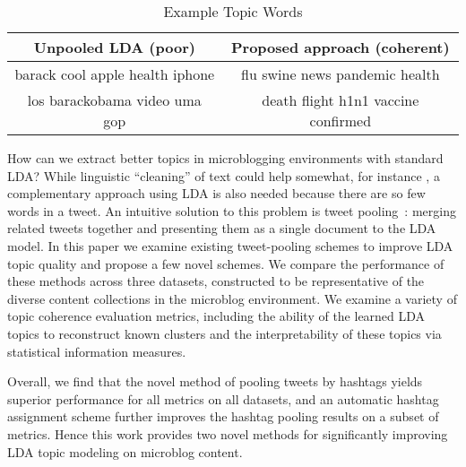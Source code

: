 \documentclass{sig-alternate}
\begin{document}
\begin{table}[t!]
\centering
\caption{Example Topic Words}\label{tbl-0}
\resizebox{8.5cm}{!} 
{
	\begin{tabular}{|c|c|}
	\hline
	 Unpooled LDA (poor) & Proposed approach (coherent) \\
\hline
 {\small barack cool apple health iphone}
 &
 {\small flu swine news pandemic health}\\
 {\small los barackobama video uma gop} & 
{\small death flight h1n1 vaccine confirmed} \\
 \hline
	\end{tabular}
}\vspace*{-10pt}
\end{table}

How can we extract better topics in microblogging environments with
standard LDA?  While linguistic ``cleaning'' of text could help
somewhat, for instance \cite{Han2012}, a complementary approach using
LDA is also needed because there are so few words in a tweet.  An
intuitive solution to this problem is tweet
pooling~\cite{Weng2010wsdm,hong}: merging related tweets together and
presenting them as a single document to the LDA model.  In this paper
we examine existing tweet-pooling schemes to improve LDA topic quality
and propose a few novel schemes.  We compare the performance of these
methods across three datasets, constructed to be representative of the
diverse content collections in the microblog environment. 
We examine a variety of topic coherence evaluation metrics, including
the ability of the learned LDA topics to reconstruct known clusters
and the interpretability of these topics via statistical information
measures.

Overall, we find that the novel method of pooling tweets by hashtags
yields superior performance for all metrics on all datasets, and an
automatic hashtag assignment scheme further improves the hashtag
pooling results on a subset of metrics.  Hence this work provides two
novel methods for significantly improving LDA topic modeling on
microblog content.

\end{document}
